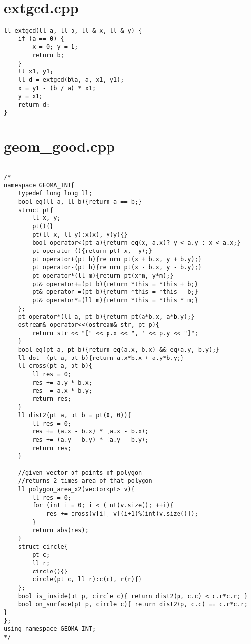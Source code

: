 \documentclass[a4paper,12pt]{report}
\begin{document}
\section{extgcd.cpp}
\begin{lstlisting}
ll extgcd(ll a, ll b, ll & x, ll & y) {
    if (a == 0) {
        x = 0; y = 1;
        return b;
    }
    ll x1, y1;
    ll d = extgcd(b%a, a, x1, y1);
    x = y1 - (b / a) * x1;
    y = x1;
    return d;
}

\end{lstlisting}


\section{geom_good.cpp}
\begin{lstlisting}

/*
namespace GEOMA_INT{
    typedef long long ll;
    bool eq(ll a, ll b){return a == b;}
    struct pt{
        ll x, y;
        pt(){}
        pt(ll x, ll y):x(x), y(y){}
        bool operator<(pt a){return eq(x, a.x)? y < a.y : x < a.x;}
        pt operator-(){return pt(-x, -y);}
        pt operator+(pt b){return pt(x + b.x, y + b.y);}
        pt operator-(pt b){return pt(x - b.x, y - b.y);}
        pt operator*(ll m){return pt(x*m, y*m);}
        pt& operator+=(pt b){return *this = *this + b;}
        pt& operator-=(pt b){return *this = *this - b;}
        pt& operator*=(ll m){return *this = *this * m;}
    };
    pt operator*(ll a, pt b){return pt(a*b.x, a*b.y);}
    ostream& operator<<(ostream& str, pt p){ 
        return str << "[" << p.x << ", " << p.y << "]";
    }
    bool eq(pt a, pt b){return eq(a.x, b.x) && eq(a.y, b.y);}
    ll dot  (pt a, pt b){return a.x*b.x + a.y*b.y;}
    ll cross(pt a, pt b){
        ll res = 0;
        res += a.y * b.x;
        res -= a.x * b.y;
        return res;
    }
    ll dist2(pt a, pt b = pt(0, 0)){
        ll res = 0;
        res += (a.x - b.x) * (a.x - b.x);
        res += (a.y - b.y) * (a.y - b.y);
        return res;
    }

    //given vector of points of polygon
    //returns 2 times area of that polygon
    ll polygon_area_x2(vector<pt> v){
        ll res = 0;
        for (int i = 0; i < (int)v.size(); ++i){
            res += cross(v[i], v[(i+1)%(int)v.size()]);
        }
        return abs(res);
    }
    struct circle{
        pt c;
        ll r;
        circle(){}
        circle(pt c, ll r):c(c), r(r){}
    };
    bool is_inside(pt p, circle c){ return dist2(p, c.c) < c.r*c.r; }
    bool on_surface(pt p, circle c){ return dist2(p, c.c) == c.r*c.r; }
};
using namespace GEOMA_INT;
*/


\end{lstlisting}
\end{document}
